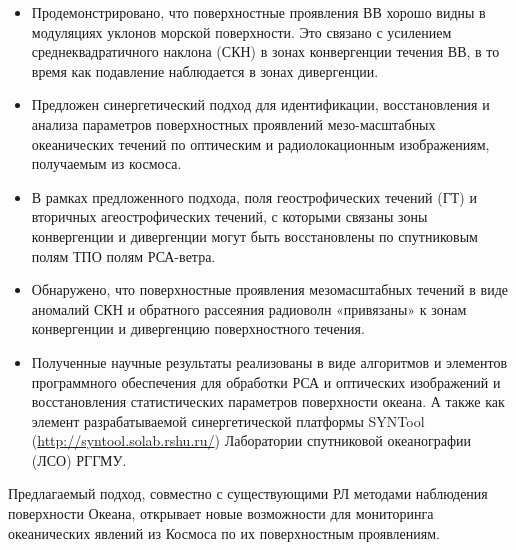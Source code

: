 \begin{itemize}
\item Продемонстрировано, что поверхностные проявления ВВ хорошо видны в модуляциях уклонов морской поверхности. Это связано с усилением среднеквадратичного наклона (СКН) в зонах конвергенции течения ВВ, в то время как подавление наблюдается в зонах дивергенции.

\item Предложен синергетический подход для идентификации, восстановления и анализа параметров поверхностных проявлений мезо-масштабных океанических течений по оптическим и радиолокационным изображениям, получаемым из космоса.

\item В рамках предложенного подхода, поля геострофических течений (ГТ) и вторичных агеострофических течений, с которыми связаны зоны конвергенции и дивергенции могут быть восстановлены по спутниковым полям ТПО полям РСА-ветра. 

\item Обнаружено, что поверхностные проявления мезомасштабных течений в виде аномалий СКН и обратного рассеяния радиоволн «привязаны» к зонам конвергенции и дивергенцию поверхностного течения.

\item Полученные научные результаты реализованы в виде алгоритмов и элементов программного обеспечения для обработки РСА и оптических изображений и восстановления статистических параметров поверхности океана. А также как элемент разрабатываемой синергетической платформы SYNTool (\url{http://syntool.solab.rshu.ru/}) Лаборатории спутниковой океанографии (ЛСО) РГГМУ.

\end{itemize}

Предлагаемый подход, совместно с существующими РЛ методами наблюдения поверхности Океана, открывает новые возможности для мониторинга океанических явлений из Космоса по их поверхностным проявлениям.

\clearpage
